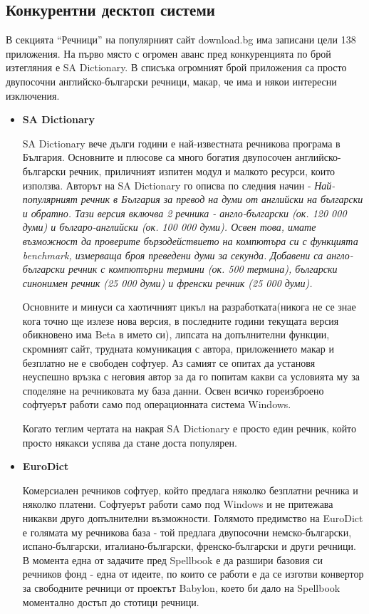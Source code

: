 \subsection{Конкурентни десктоп системи}
В секцията "`Речници"' на популярният сайт download.bg има записани
цели 138 приложения. На първо място с огромен аванс пред конкуренцията
по брой изтегляния е SA Dictionary. В списъка огромният брой
приложения са просто двупосочни английско-български речници, макар, че
има и някои интересни изключения.
\begin{itemize}
  \item \textbf{SA Dictionary}

    SA Dictionary вече дълги години е най-известната речникова
    програма в България. Основните и плюсове са много богатия
    двупосочен английско-български речник, приличният изпитен модул и
    малкото ресурси, които използва. Авторът на SA Dictionary го
    описва по следния начин - \emph{Най-популярният речник в България за
    превод на думи от английски на български и обратно. Тази версия
    включва 2 речника - англо-български (ок. 120 000 думи) и
    българо-английски (ок. 100 000 думи). Освен това, имате възможност
    да проверите бързодействието на компютъра си с функцията
    benchmark, измерваща броя преведени думи за секунда. Добавени са
    англо-български речник с компютърни термини (ок. 500 термина),
    български синонимен речник (25 000 думи) и френски речник (25 000
    думи).}

    Основните и минуси са хаотичният цикъл на разработката(никога не
    се знае кога точно ще излезе нова версия, в последните години
    текущата версия обикновено има Beta в името си), липсата на
    допълнителни функции, скромният сайт, трудната комуникация с
    автора, приложението макар и безплатно не е свободен софтуер. Аз
    самият се опитах да установя неуспешно връзка с неговия автор за
    да го попитам какви са условията му за споделяне на речниковата му
    база данни. Освен всичко гореизброено софтуерът работи само под
    операционната система Windows.

    Когато теглим чертата на накрая SA Dictionary е просто един
    речник, който просто някакси успява да стане доста популярен.

  \item \textbf{EuroDict}

    Комерсиален речников софтуер, който предлага няколко безплатни
    речника и няколко платени. Софтуерът работи само под Windows и не
    притежава никакви друго допълнителни възможности. Голямото
    предимство на EuroDict е голямата му речникова база - той предлага
    двупосочни немско-български, испано-български, италиано-български,
    френско-български и други речници. В момента една от задачите пред
    Spellbook е да разшири базовия си речников фонд - една от идеите,
    по които се работи е да се изготви конвертор за свободните речници
    от проектът Babylon, което би дало на Spellbook моментално достъп
    до стотици речници.


\end{itemize}
